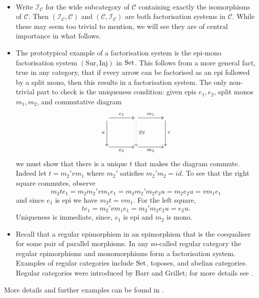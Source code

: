 \begin{examples} \label{ex.factsysts}\ 

  \begin{itemize}
    \item Write $\mathcal I_{\mathcal C}$ for the wide subcategory of
      $\mathcal C$ containing exactly the isomorphisms of $\mathcal C$. Then
      $(\mathcal I_{\mathcal C}, \mathcal C)$ and $(\mathcal C, \mathcal
      I_{\mathcal C})$ are both factorisation systems in $\mathcal C$. While
      these may seem too trivial to mention, we will see they are of central
      importance in what follows.
    
    \item The prototypical example of a factorisation system is the epi-mono
      factorisation system $(\mathrm{Sur},\mathrm{Inj})$ in $\mathrm{Set}$. This follows
      from a more general fact, true in any category, that if every arrow can be
      factorised as an epi followed by a split mono, then this results in a
      factorisation system.  The only non-trivial part to check is the
      uniqueness condition: given epis $e_1,e_2$, split monos $m_1,m_2$, and
      commutative diagram
      \[
	\xymatrixcolsep{3pc}
	\xymatrixrowsep{3pc}
	\xymatrix{
	  \ar[r]^{e_1} \ar[d]_u & \ar[r]^{m_1} \ar@{.>}[d]^{\exists! t} &
	  \ar[d]^v \\
	  \ar[r]_{e_2}& \ar[r]_{m_2} & 
	}
      \]
      we must show that there is a unique $t$ that makes the diagram commute.
      Indeed let $t= m_2'vm_1$ where $m_2'$ satisfies $m_2'm_2=id$. 
      To see that the right square commutes, observe
      \[
	m_2 t e_1 =  m_2 m_2' v m_1 e_1 = m_2 m_2' m_2 e_2 u = m_2 e_2 u = v m_1 e_1
      \]
      and since $e_1$ is epi we have $m_2 t = v m_1$. For the left square,
      \[
	t e_1 = m_2' v m_1 e_1 = m_2' m_2 e_2 u = e_2 u.
      \] 
      Uniqueness is immediate, since, $e_1$ is epi and $m_2$ is mono. 
    
    \item Recall that a regular epimorphism in an epimorphism that is the
      coequaliser for some pair of parallel morphisms. In any so-called regular
      category the regular epimorphisms and monomorphisms form a factorisation
      system.  Examples of regular categories include $\mathrm{Set}$, toposes, and
      abelian categories. Regular categories were introduced by Barr and
      Grillet; for more details see \cite{Bar71,Gri71}.
\end{itemize}
More details and further examples can be found in \cite[]{AHS}.
\end{examples}

